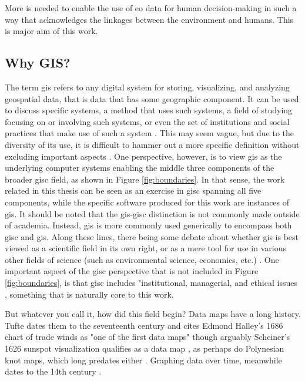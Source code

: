 More is needed to enable the use of \ac{eo} data for human decision-making in such a way that acknowledges the linkages between the environment and humans. This is major aim of this work. 

\subsection{Why GIS?} \label{sec:gis}

The term \acf{gis} refers to any digital system for storing, visualizing, and analyzing geospatial data, that is data that has some geographic component. It can be used to discuss specific systems, a method that uses such systems, a field of studying focusing on or involving such systems, or even the set of institutions and social practices that make use of such a system \cite{sheppardGISSocietyResearch1995}. This may seem vague, but due to the diversity of its use, it is difficult to hammer out a more specific definition without excluding important aspects \cite{goodchildOverviewDefinitionGIS1992, picklesToolScienceGIS1997, chrismanWhatDoesGIS1999, heikkilaGISDeadLong1998}. One perspective, however, is to view \ac{gis} as the underlying computer systems enabling the middle three components of the broader \ac{gisc} field, as shown in Figure \ref{fig:boundaries}. In that sense, the work related in this thesis can be seen as an exercise in \ac{gisc} spanning all five components, while the specific software produced for this work are instances of \ac{gis}. It should be noted that the \ac{gis}-\ac{gisc} distinction is not commonly made outside of academia. Instead, \ac{gis} is more commonly used generically to encompass both \ac{gisc} and \ac{gis}. Along these lines, there being some debate about whether \ac{gis} is best viewed as a scientific field in its own right, or as a mere tool for use in various other fields of science (such as environmental science, economics, etc.) \cite{goodchildGeographicalInformationScience1992,goodchildTwentyYearsProgress2010}. One important aspect of the 
\ac{gisc} perspective that is not included in Figure \ref{fig:boundaries}, is that \ac{gisc} includes "institutional, managerial, and ethical issues \cite{goodchildGeographicalInformationScience1992}, something that is naturally core to this work. 

But whatever you call it, how did this field begin? Data maps have a long history. Tufte dates them to the seventeenth century and cites Edmond Halley's 1686 chart of trade winds as "one of the first data maps" \cite{tufteVisualDisplayQuantitative2001} though arguably Scheiner's 1626 sunspot visualization qualifies as a data map \cite{friendlyBriefHistoryData2008}, as perhaps do Polynesian knot maps, which long predates either \cite{davenportMarshallIslandsNavigational1960}. Graphing data over time, meanwhile dates to the 14th century \cite{friendlyBriefHistoryData2008}.


